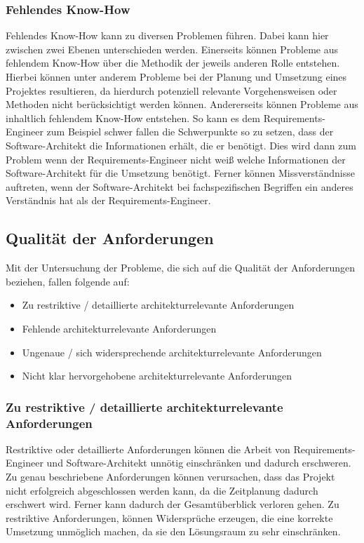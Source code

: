 \subsubsection{Fehlendes Know-How}
Fehlendes Know-How kann zu diversen Problemen führen. Dabei kann hier zwischen zwei Ebenen unterschieden werden. Einerseits können Probleme aus fehlendem Know-How über die Methodik der jeweils anderen Rolle entstehen. Hierbei können unter anderem Probleme bei der Planung und Umsetzung eines Projektes resultieren, da hierdurch potenziell relevante Vorgehensweisen oder Methoden nicht berücksichtigt werden können. Andererseits können Probleme aus inhaltlich fehlendem Know-How entstehen. So kann es dem Requirements-Engineer zum Beispiel schwer fallen die Schwerpunkte so zu setzen, dass der Software-Architekt die Informationen erhält, die er benötigt. Dies wird dann zum Problem wenn der Requirements-Engineer nicht weiß welche Informationen der Software-Architekt für die Umsetzung benötigt. Ferner können Missverständnisse auftreten, wenn der Software-Architekt bei fachspezifischen Begriffen ein anderes Verständnis hat als der Requirements-Engineer. 

\subsection{Qualit\"at der Anforderungen}

Mit der Untersuchung der Probleme, die sich auf die Qualität der Anforderungen beziehen, fallen folgende auf:
\begin{itemize}
\item Zu restriktive / detaillierte architekturrelevante Anforderungen
\item Fehlende architekturrelevante Anforderungen
\item Ungenaue / sich widersprechende architekturrelevante Anforderungen
\item Nicht klar hervorgehobene architekturrelevante Anforderungen\\
\end{itemize}

\subsubsection{Zu restriktive / detaillierte architekturrelevante Anforderungen}
Restriktive oder detaillierte Anforderungen können die Arbeit von Requirements-Engineer und Software-Architekt unnötig einschränken und dadurch erschweren. Zu genau beschriebene Anforderungen können verursachen, dass das Projekt nicht erfolgreich abgeschlossen werden kann, da die Zeitplanung dadurch erschwert wird. Ferner kann dadurch der Gesamtüberblick verloren gehen. Zu restriktive Anforderungen, können Widersprüche erzeugen, die eine korrekte Umsetzung unmöglich machen, da sie den Lösungsraum zu sehr einschränken. 

